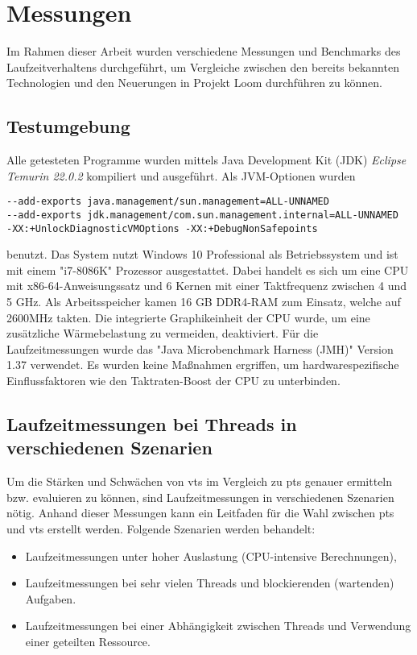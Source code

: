 \chapter{Messungen}
\label{cha:Messungen}
    Im Rahmen dieser Arbeit wurden verschiedene Messungen und Benchmarks des Laufzeitverhaltens durchgeführt, um Vergleiche zwischen den bereits bekannten Technologien und den Neuerungen in Projekt Loom 
    durchführen zu können. 

\section{Testumgebung}                                         
\label{sec:Testumgebung}

    Alle getesteten Programme wurden mittels Java Development Kit (JDK) \emph{Eclipse Temurin 22.0.2} kompiliert und ausgeführt. Als JVM-Optionen wurden 
\begin{verbatim}
--add-exports java.management/sun.management=ALL-UNNAMED 
--add-exports jdk.management/com.sun.management.internal=ALL-UNNAMED 
-XX:+UnlockDiagnosticVMOptions -XX:+DebugNonSafepoints\end{verbatim}
    benutzt.
    Das System nutzt Windows 10 Professional als Betriebssystem und ist mit einem "i7-8086K" Prozessor ausgestattet. Dabei handelt es sich um eine CPU mit x86-64-Anweisungssatz und 6 
    Kernen mit einer Taktfrequenz zwischen 4 und 5 GHz. Als Arbeitsspeicher kamen  16 GB DDR4-RAM zum Einsatz, welche auf 2600MHz takten. Die integrierte Graphikeinheit der CPU wurde, 
    um eine zusätzliche Wärmebelastung zu vermeiden, deaktiviert. 
    Für die Laufzeitmessungen wurde das "Java Microbenchmark Harness (JMH)" Version 1.37 verwendet.
    Es wurden keine Maßnahmen ergriffen, um hardwarespezifische Einflussfaktoren wie den Taktraten-Boost der CPU zu unterbinden.


\section{Laufzeitmessungen bei Threads in verschiedenen Szenarien}                                         
\label{sec:LaufzeitmessungenbeiThreadsinverschiedenenSzenarien}

    Um die Stärken und Schwächen von \Glspl{vt} im Vergleich zu \Glspl{pt} genauer ermitteln bzw. evaluieren zu können, sind Laufzeitmessungen in verschiedenen Szenarien nötig. 
    Anhand dieser Messungen kann ein Leitfaden für die Wahl zwischen \Glspl{pt} und \Glspl{vt} erstellt werden. 
    Folgende Szenarien werden behandelt:
    \begin{itemize}
        \item Laufzeitmessungen unter hoher Auslastung (CPU-intensive Berechnungen),  
        \item Laufzeitmessungen bei sehr vielen Threads und blockierenden (wartenden) Aufgaben.
        \item Laufzeitmessungen bei einer Abhängigkeit zwischen Threads und Verwendung einer geteilten Ressource.
    \end{itemize}


